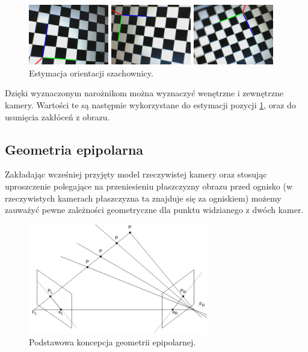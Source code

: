 \documentclass[oneside, eng]{mgr}
\begin{document}
\begin{figure}
\centering
		\begin{minipage}{3.5cm}
			\includegraphics[width=3.5cm]{left8.jpg}
		\end{minipage}
		\begin{minipage}{3.5cm}
			\includegraphics[width=3.5cm]{left17.jpg}
		\end{minipage}
		\begin{minipage}{3.5cm}
			\includegraphics[width=3.5cm]{left24.jpg}
		\end{minipage}
	\caption{Estymacja orientacji szachownicy. }
	\label{fig:pose}
\end{figure}

Dzięki wyznaczonym narożnikom można wyznaczyć wenętrzne i zewnętrzne kamery. Wartości te są następnie wykorzystane do estymacji pozycji \ref{fig:pose}, oraz do usunięcia zakłóceń z obrazu. 

\subsection{Geometria epipolarna}

Zakładając wcześniej przyjęty model rzeczywistej kamery oraz stosując uproszczenie polegające na przeniesieniu płaszczyzny obrazu przed ognisko (w rzeczywistych kamerach płaszczyzna ta znajduje się za ogniskiem) możemy zauważyć pewne zależności geometryczne dla punktu widzianego z dwóch kamer. 

\begin{figure}
\centering
	\includegraphics[width=0.70\textwidth]{epipolar.jpg}\par\vspace{1cm}
\caption{Podstawowa koncepcja geometrii epipolarnej.}
	\label{fig:gradient}
\end{figure}
\end{document}
